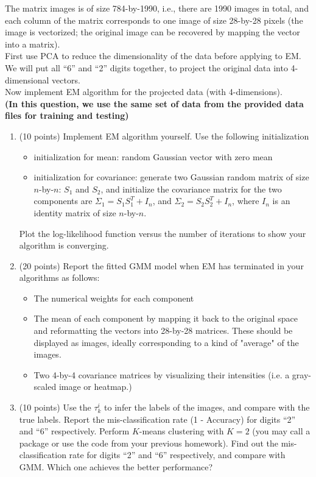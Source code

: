 \documentclass[12pt]{article}
\begin{document}
The matrix \textsf{images} is of size 784-by-1990, i.e., there are 1990 images in total, and each column of the matrix corresponds to one image of size 28-by-28 pixels (the image is vectorized; the original image can be recovered by mapping the vector into a matrix).  \\

First use PCA to reduce the dimensionality of the data before applying to EM. We will put all ``6'' and ``2'' digits together, to project the original data into 4-dimensional vectors. \\

Now implement EM algorithm for the projected data (with 4-dimensions). \\
\textbf{(In this question, we use the same set of data from the provided data files for training and testing)}

\begin{enumerate}[label*=\arabic*.]


\item (10 points) Implement EM algorithm yourself. Use the following initialization
\begin{itemize}
\item initialization for mean: random Gaussian vector with zero mean
\item initialization for covariance: generate two Gaussian random matrix of size $n$-by-$n$: $S_1$ and $S_2$, and initialize the covariance matrix for the two components are $\Sigma_1 = S_1 S_1^T + I_n$, and  $\Sigma_2 = S_2 S_2^T + I_n$, where $I_n$ is an identity matrix of size $n$-by-$n$. 
\end{itemize}
Plot the log-likelihood function versus the number of iterations to show your algorithm is converging.

\item (20 points) Report the fitted GMM model when EM has terminated in your algorithms as follows:
\begin{itemize}
    \item The numerical weights for each component
    \item The mean of each component by mapping it back to the original space and reformatting the vectors into 28-by-28 matrices. These should be displayed as images, ideally corresponding to a kind of "average" of the images.
    \item Two 4-by-4 covariance matrices by visualizing their intensities (i.e. a gray-scaled image or heatmap.)
\end{itemize}

\item (10 points) Use the $\tau_{k}^i$ to infer the labels of the images, and compare with the true labels. Report the mis-classification rate (1 - Accuracy) for digits ``2'' and ``6'' respectively. Perform $K$-means clustering with $K=2$ (you may call a package or use the code from your previous homework). Find out the  mis-classification rate for digits ``2'' and ``6'' respectively, and compare with GMM. Which one achieves the better performance?

\end{enumerate}
\end{document}
